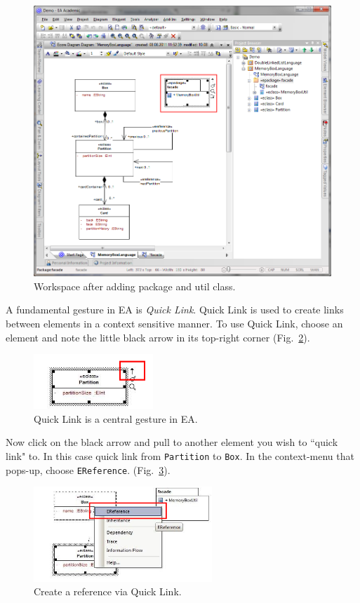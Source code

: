 \begin{figure}[htbp]
	\centering
  \includegraphics[width=.8\textwidth]{pics/memBox22.png}
	\caption{Workspace after adding package and util class.}
	\label{fig:epackage_completed}
\end{figure}

A fundamental gesture in EA is \emph{Quick Link}.  Quick Link is used to create
links between elements in a context sensitive manner.  To use Quick Link,
choose an element and note the little black arrow in its top-right corner
(Fig.~\ref{fig:quicklink}).

\begin{figure}[htbp]
	\centering
  \includegraphics[width=0.4\textwidth]{pics/memBox23.png}
	\caption{Quick Link is a central gesture in EA.} 
	\label{fig:quicklink}
\end{figure}

\clearpage 

Now click on the black arrow and pull to another element you wish to ``quick
link" to.  In this case quick link from \texttt{Partition} to \texttt{Box}.  In
the context-menu that pops-up, choose \texttt{EReference}.
(Fig.~\ref{fig:ereference}). 

\begin{figure}[htbp]
	\centering
  \includegraphics[width=0.6\textwidth]{pics/memBox24.png}
	\caption{Create a reference via Quick Link.}
	\label{fig:ereference}
\end{figure}

